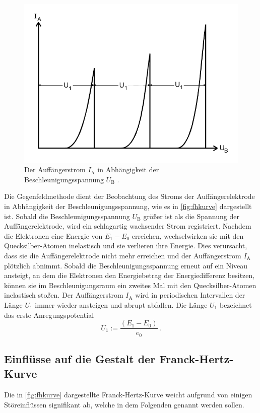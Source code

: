 \begin{figure}[H]
    \centering
    \includegraphics[width=0.6\linewidth]{pictures/frank-hertz-kurve.pdf}
    \caption{Der Auffängerstrom $I_\text{A}$ in Abhängigkeit der Beschleunigungsspannung $U_\text{B}$ \cite{v601}.}
    \label{fig:fhkurve}
\end{figure}

Die Gegenfeldmethode dient der Beobachtung des Stroms der Auffängerelektrode in Abhängigkeit der Beschleunigungsspannung,
wie es in \autoref{fig:fhkurve} dargestellt ist.
Sobald die Beschleunigungsspannung $U_\text{B}$ größer ist als die Spannung der Auffängerelektrode, wird ein schlagartig wachsender Strom registriert.
Nachdem die Elektronen eine Energie von $E_1 - E_0$ erreichen, wechselwirken sie mit den Quecksilber-Atomen inelastisch und sie verlieren ihre Energie.
Dies verursacht, dass sie die Auffängerelektrode nicht mehr erreichen und der Auffängerstrom $I_\text{A}$ plötzlich abnimmt.
Sobald die Beschleunigungsspannung erneut auf ein Niveau ansteigt, an dem die Elektronen den Energiebetrag der Energiedifferenz besitzen,
können sie im Beschleunigungsraum ein zweites Mal mit den Quecksilber-Atomen inelastisch stoßen.
Der Auffängerstrom $I_\text{A}$ wird in periodischen Intervallen der Länge $U_1$ immer wieder ansteigen und abrupt abfallen. 
Die Länge $U_1$ bezeichnet das erste Anregungspotential
\begin{equation}\label{eq:u1}
    U_{1}:=\frac{\left(E_{1}-E_{0}\right)}{e_{0}} \, .
\end{equation}


\subsection{Einflüsse auf die Gestalt der Franck-Hertz-Kurve}

Die in \autoref{fig:fhkurve} dargestellte Franck-Hertz-Kurve weicht aufgrund von einigen Störeinflüssen signifikant ab, 
welche in dem Folgenden genannt werden sollen.


